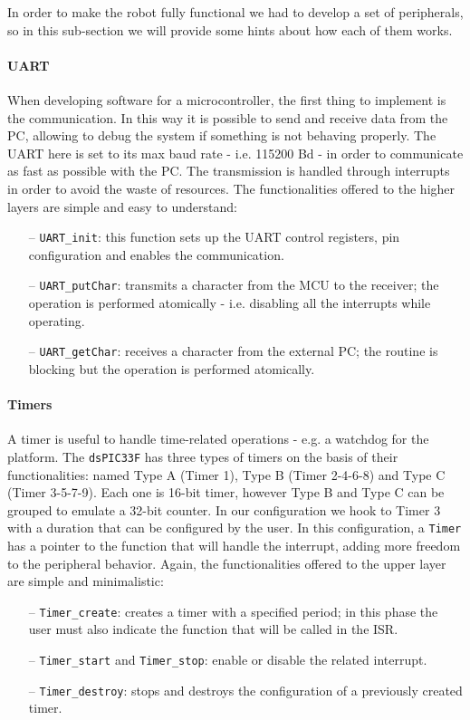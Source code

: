 \documentclass[10pt,a4paper, notitlepage]{report}
\begin{document}
In order to make the robot fully functional we had to develop a set of peripherals, so in this sub-section we will provide some hints about how each of them works.
\paragraph*{UART}
When developing software for a microcontroller, the first thing to implement is the communication. In this way it is possible to send and receive data from the PC, allowing to debug the system if something is not behaving properly. 
The UART here is set to its max baud rate - i.e. 115200 Bd - in order to communicate as fast as possible with the PC. The transmission is handled through interrupts in order to avoid the waste of resources. The functionalities offered to the higher layers are simple and easy to understand:
\begin{itemize}
  \item[--] \texttt{UART\_init}: this function sets up the UART control registers, pin configuration and enables the communication.
  \item[--] \texttt{UART\_putChar}: transmits a character from the MCU to the receiver; the operation is performed atomically - i.e. disabling all the interrupts while operating.
  \item[--] \texttt{UART\_getChar}: receives a character from the external PC; the routine is blocking but the operation is performed atomically.
\end{itemize}
\paragraph*{Timers}
A timer is useful to handle time-related operations - e.g. a watchdog for the platform. The \texttt{dsPIC33F} has three types of timers on the basis of their functionalities: named Type A (Timer 1), Type B (Timer 2-4-6-8) and Type C (Timer 3-5-7-9). Each one is 16-bit timer, however Type B and Type C can be grouped to emulate a 32-bit counter. In our configuration we hook to Timer 3 with a duration that can be configured by the user. In this configuration, a \texttt{Timer} has a pointer to the function that will handle the interrupt, adding more freedom to the peripheral behavior. Again, the functionalities offered to the upper layer are simple and minimalistic:
\begin{itemize}
  \item[--] \texttt{Timer\_create}: creates a timer with a specified period; in this phase the user must also indicate the function that will be called in the ISR.
  \item[--] \texttt{Timer\_start} and \texttt{Timer\_stop}: enable or disable the related interrupt.
  \item[--] \texttt{Timer\_destroy}: stops and destroys the configuration of a previously created timer.
\end{itemize}
\end{document}
